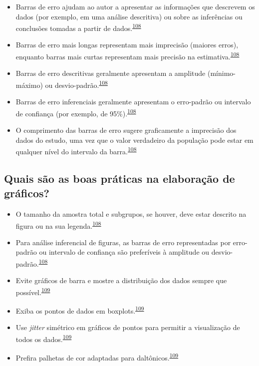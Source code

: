 \documentclass[
]{book}
\begin{document}
\begin{itemize}
\item
  Barras de erro ajudam ao autor a apresentar as informações que descrevem os dados (por exemplo, em uma análise descritiva) ou sobre as inferências ou conclusões tomadas a partir de dados.\textsuperscript{\protect\hyperlink{ref-Cumming2007}{108}}
\item
  Barras de erro mais longas representam mais imprecisão (maiores erros), enquanto barras mais curtas representam mais precisão na estimativa.\textsuperscript{\protect\hyperlink{ref-Cumming2007}{108}}
\item
  Barras de erro descritivas geralmente apresentam a amplitude (mínimo-máximo) ou desvio-padrão.\textsuperscript{\protect\hyperlink{ref-Cumming2007}{108}}
\item
  Barras de erro inferenciais geralmente apresentam o erro-padrão ou intervalo de confiança (por exemplo, de 95\%).\textsuperscript{\protect\hyperlink{ref-Cumming2007}{108}}
\item
  O comprimento das barras de erro sugere graficamente a imprecisão dos dados do estudo, uma vez que o valor verdadeiro da população pode estar em qualquer nível do intervalo da barra.\textsuperscript{\protect\hyperlink{ref-Cumming2007}{108}}
\end{itemize}

\hypertarget{quais-suxe3o-as-boas-pruxe1ticas-na-elaborauxe7uxe3o-de-gruxe1ficos}{%
\subsection{Quais são as boas práticas na elaboração de gráficos?}\label{quais-suxe3o-as-boas-pruxe1ticas-na-elaborauxe7uxe3o-de-gruxe1ficos}}

\begin{itemize}
\item
  O tamanho da amostra total e subgrupos, se houver, deve estar descrito na figura ou na sua legenda.\textsuperscript{\protect\hyperlink{ref-Cumming2007}{108}}
\item
  Para análise inferencial de figuras, as barras de erro representadas por erro-padrão ou intervalo de confiança são preferíveis à amplitude ou desvio-padrão.\textsuperscript{\protect\hyperlink{ref-Cumming2007}{108}}
\item
  Evite gráficos de barra e mostre a distribuição dos dados sempre que possível.\textsuperscript{\protect\hyperlink{ref-Weissgerber2019}{109}}
\item
  Exiba os pontos de dados em boxplots.\textsuperscript{\protect\hyperlink{ref-Weissgerber2019}{109}}
\item
  Use \emph{jitter} simétrico em gráficos de pontos para permitir a visualização de todos os dados.\textsuperscript{\protect\hyperlink{ref-Weissgerber2019}{109}}
\item
  Prefira palhetas de cor adaptadas para daltônicos.\textsuperscript{\protect\hyperlink{ref-Weissgerber2019}{109}}
\end{itemize}
\end{document}
